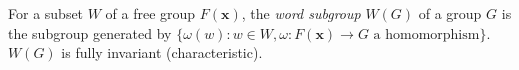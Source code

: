 For a subset $W$ of a free group $F(\mathbf{x})$, the \textit{word subgroup} $W(G)$ of a group $G$ is the subgroup generated by $\{\omega(w) : w \in W, \omega: F(\mathbf{x}) \to G \text{ a homomorphism}\}$. $W(G)$ is fully invariant (characteristic).
